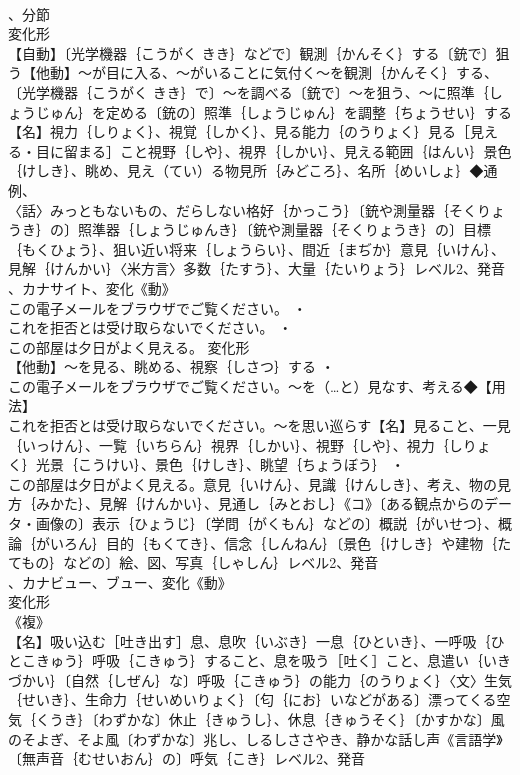 \documentclass[8pt]{extreport}
\begin{document}
\begin{CJK}{UTF8}{min}
\\	、分節
\\	変化形 
\\	【自動】〔光学機器｛こうがく きき｝などで〕観測｛かんそく｝する〔銃で〕狙う【他動】～が目に入る、～がいることに気付く～を観測｛かんそく｝する、〔光学機器｛こうがく きき｝で〕～を調べる〔銃で〕～を狙う、～に照準｛しょうじゅん｝を定める〔銃の〕照準｛しょうじゅん｝を調整｛ちょうせい｝する【名】視力｛しりょく｝、視覚｛しかく｝、見る能力｛のうりょく｝見る［見える・目に留まる］こと視野｛しや｝、視界｛しかい｝、見える範囲｛はんい｝景色｛けしき｝、眺め、見え（てい）る物見所｛みどころ｝、名所｛めいしょ｝◆通例、
\\	〈話〉みっともないもの、だらしない格好｛かっこう｝〔銃や測量器｛そくりょうき｝の〕照準器｛しょうじゅんき｝〔銃や測量器｛そくりょうき｝の〕目標｛もくひょう｝、狙い近い将来｛しょうらい｝、間近｛まぢか｝意見｛いけん｝、見解｛けんかい｝〈米方言〉多数｛たすう｝、大量｛たいりょう｝レベル2、発音
\\	、カナサイト、変化《動》
\\	この電子メールをブラウザでご覧ください。 ・
\\	これを拒否とは受け取らないでください。 ・
\\	この部屋は夕日がよく見える。	変化形 
\\	【他動】～を見る、眺める、視察｛しさつ｝する ・
\\	この電子メールをブラウザでご覧ください。～を（…と）見なす、考える◆【用法】
\\	これを拒否とは受け取らないでください。～を思い巡らす【名】見ること、一見｛いっけん｝、一覧｛いちらん｝視界｛しかい｝、視野｛しや｝、視力｛しりょく｝光景｛こうけい｝、景色｛けしき｝、眺望｛ちょうぼう｝ ・
\\	この部屋は夕日がよく見える。意見｛いけん｝、見識｛けんしき｝、考え、物の見方｛みかた｝、見解｛けんかい｝、見通し｛みとおし｝《コ》〔ある観点からのデータ・画像の〕表示｛ひょうじ｝〔学問｛がくもん｝などの〕概説｛がいせつ｝、概論｛がいろん｝目的｛もくてき｝、信念｛しんねん｝〔景色｛けしき｝や建物｛たてもの｝などの〕絵、図、写真｛しゃしん｝レベル2、発音
\\	、カナビュー、ブュー、変化《動》
\\	変化形 
\\	《複》
\\	【名】吸い込む［吐き出す］息、息吹｛いぶき｝一息｛ひといき｝、一呼吸｛ひとこきゅう｝呼吸｛こきゅう｝すること、息を吸う［吐く］こと、息遣い｛いきづかい｝〔自然｛しぜん｝な〕呼吸｛こきゅう｝の能力｛のうりょく｝〈文〉生気｛せいき｝、生命力｛せいめいりょく｝〔匂｛にお｝いなどがある〕漂ってくる空気｛くうき｝〔わずかな〕休止｛きゅうし｝、休息｛きゅうそく｝〔かすかな〕風のそよぎ、そよ風〔わずかな〕兆し、しるしささやき、静かな話し声《言語学》〔無声音｛むせいおん｝の〕呼気｛こき｝レベル2、発音

\end{CJK}
\end{document}
